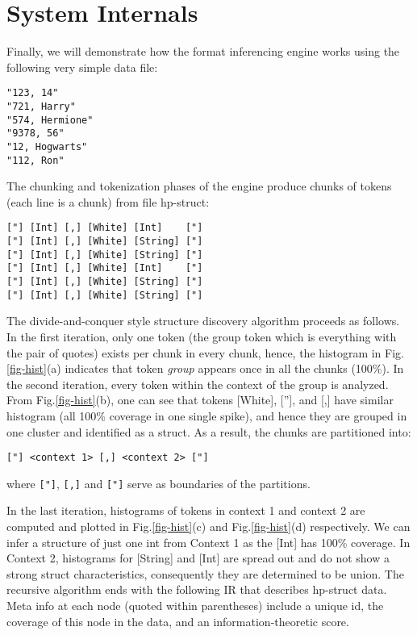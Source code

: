 \documentclass[preprint]{sig-alternate-sigmod08}
\begin{document}
\section{System Internals}
Finally, we will demonstrate 
how the format inferencing engine works
using the following very simple data file:

{\small
\begin{verbatim}
"123, 14"
"721, Harry"
"574, Hermione"
"9378, 56"
"12, Hogwarts"
"112, Ron"
\end{verbatim}
}


The chunking and tokenization phases of the engine produce
chunks of tokens (each line is a chunk) from file hp-struct:

{\small
\begin{verbatim}
["] [Int] [,] [White] [Int]    ["]
["] [Int] [,] [White] [String] ["]
["] [Int] [,] [White] [String] ["]
["] [Int] [,] [White] [Int]    ["]
["] [Int] [,] [White] [String] ["]
["] [Int] [,] [White] [String] ["]
\end{verbatim}
}

The divide-and-conquer style structure discovery algorithm proceeds
as follows. In the first iteration, only one token (the group
token which is everything with the pair of quotes) exists per
chunk in every chunk, hence, the histogram in Fig.\ref{fig-hist}(a) indicates
that token {\em group} appears once in all the chunks (100\%).
In the second iteration, every token within the context of the
group is analyzed. From Fig.\ref{fig-hist}(b), one can see that
tokens [White], [''], and [,] have similar histogram
(all 100\% coverage in one single spike), and hence they are
grouped in one cluster and identified as a struct. As a result,
the chunks are partitioned into:

{\small
\begin{verbatim}
["] <context 1> [,] <context 2> ["]
\end{verbatim}
}
\noindent where \verb#["]#, \verb#[,]# and \verb#["]# serve as
boundaries of the partitions.

In the last iteration, histograms of tokens in context 1 and
context 2 are computed and plotted in Fig.\ref{fig-hist}(c) and Fig.\ref{fig-hist}(d) 
respectively. We can infer a structure of just one int
from Context 1 as the [Int] has 100\% coverage. In Context 2,
histograms for [String] and [Int] are spread out and do not
show a strong struct characteristics, consequently they are 
determined to be union. The recursive algorithm ends with
the following IR that describes hp-struct data. Meta info
at each node (quoted within parentheses) include a unique id, 
the coverage of this node in the data, 
and an information-theoretic score. 
\end{document}
